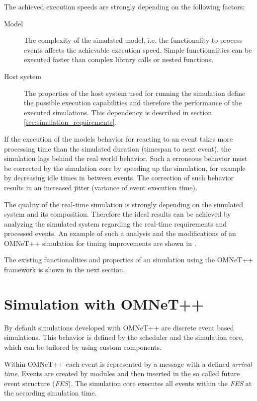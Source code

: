 The achieved execution speeds are strongly depending on the following factors:
\begin{description}
    \item[Model] The complexity of the simulated model, i.e. the functionality to process events affects the achievable execution speed.
                 Simple functionalities can be executed faster than complex library calls or nested functions.
    \item[Host system] The properties of the host system used for running the simulation define the possible execution capabilities and therefore the performance of the executed simulations.
                       This dependency is described in section \ref{sec:simulation_requirements}.
\end{description}

If the execution of the models behavior for reacting to an event takes more processing time than the simulated duration (timespan to next event), the simulation lags behind the real world behavior.
Such a erroneous behavior must be corrected by the simulation core by speeding up the simulation, for example by decreasing idle times in between events.
The correction of such behavior results in an increased jitter (variance of event execution time).
\cite[section III.B]{belanger_what_2010}

The quality of the real-time simulation is strongly depending on the simulated system and its composition.
Therefore the ideal results can be achieved by analyzing the simulated system regarding the real-time requirements and processed events.
An example of such a analysis and the modifications of an OMNeT++ simulation for timing improvements are shown in \cite{scussel_improvements_2015}.

The existing functionalities and properties of an simulation using the OMNeT++ framework is shown in the next section.

\section{Simulation with OMNeT++}
\label{sec:simulation_omnet}
By default simulations developed with OMNeT++ are discrete event based simulations.
This behavior is defined by the scheduler and the simulation core, which can be tailored by using custom components. \cite[section 4.1]{omnet_manual}

Within OMNeT++ each event is represented by a message with a defined \emph{arrival time}.
Events are created by modules and then inserted in the so called future event structure (\emph{FES}).
The simulation core executes all events within the \emph{FES} at the according simulation time.


